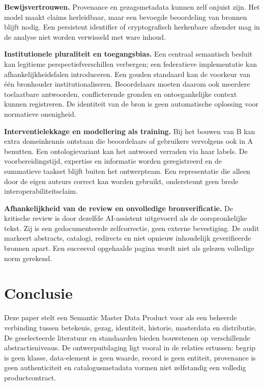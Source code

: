 \textbf{Bewijsvertrouwen.} Provenance en gezagsmetadata kunnen zelf onjuist zijn. Het model maakt claims herleidbaar, maar een bevoegde beoordeling van bronnen blijft nodig. Een persistent identifier of cryptografisch herkenbare afzender mag in de analyse niet worden verwisseld met ware inhoud. \citep{S33,S21,S39}

\textbf{Institutionele pluraliteit en toegangsbias.} Een centraal semantisch besluit kan legitieme perspectiefverschillen verbergen; een federatieve implementatie kan afhankelijkheidsfalen introduceren. Een gouden standaard kan de voorkeur van één bronhouder institutionaliseren. Beoordelaars moeten daarom ook meerdere toelaatbare antwoorden, conflicterende gronden en ontoegankelijke context kunnen registreren. De identiteit van de bron is geen automatische oplossing voor normatieve onenigheid.

\textbf{Interventielekkage en modellering als training.} Bij het bouwen van B kan extra domeinkennis ontstaan die beoordelaars of gebruikers vervolgens ook in A benutten. Een ontologievariant kan het antwoord verraden via haar labels. De voorbereidingstijd, expertise en informatie worden geregistreerd en de summatieve taakset blijft buiten het ontwerpteam. Een representatie die alleen door de eigen auteurs correct kan worden gebruikt, ondersteunt geen brede interoperabiliteitsclaim.

\textbf{Afhankelijkheid van de review en onvolledige bronverificatie.} De kritische review is door dezelfde AI-assistent uitgevoerd als de oorspronkelijke tekst. Zij is een gedocumenteerde zelfcorrectie, geen externe bevestiging. De audit markeert abstracts, catalogi, redirects en niet opnieuw inhoudelijk geverifieerde bronnen apart. Een succesvol opgehaalde pagina wordt niet als gelezen volledige norm gerekend.

\section{Conclusie}
Deze paper stelt een Semantic Master Data Product voor als een beheerde verbinding tussen betekenis, gezag, identiteit, historie, masterdata en distributie. De geselecteerde literatuur en standaarden bieden bouwstenen op verschillende abstractieniveaus. De ontwerpuitdaging ligt vooral in de relaties ertussen: begrip is geen klasse, data-element is geen waarde, record is geen entiteit, provenance is geen authenticiteit en catalogusmetadata vormen niet zelfstandig een volledig productcontract.

